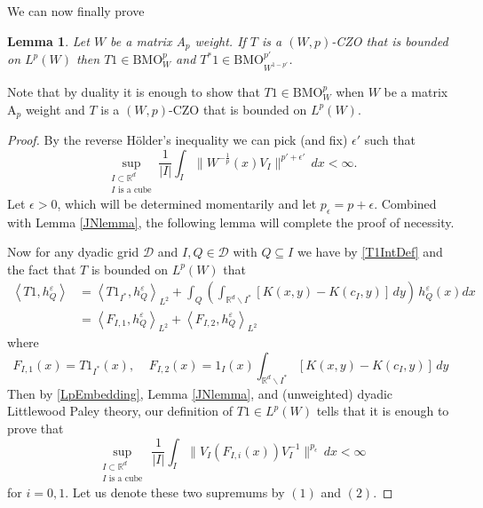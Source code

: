 \documentclass[12pt,reqno ]{amsart}
\numberwithin{equation}{section}
\newtheorem{lemma}[theorem]{Lemma}
\theoremstyle{definition}
\newcommand{\R}{\ensuremath{\mathbb{R}}}
\newcommand{\Rd}{\ensuremath{\mathbb{R}^d}}
\newcommand{\D}{\ensuremath{\mathscr{D}}}
\newcommand{\BMOW}{\ensuremath{{\text{BMO}}_W ^p}}
\newcommand{\BMOWq}{\ensuremath{{\text{BMO}}_{W^{1 - p'}}^{p'} }}
\newcommand{\ip}[2]{\ensuremath{\left\langle#1,#2\right\rangle}}
\begin{document}
We can now finally prove
 \begin{lemma} Let $W$ be a matrix A${}_p$ weight.  If $T$ is a $(W, p)$-CZO that is bounded on $L^p(W)$ then $T1 \in \BMOW$ and $T^* 1 \in \BMOWq$.
 \end{lemma}


Note that by duality it is enough to show that $T1 \in \BMOW$ when $W$ be a matrix A${}_p$ weight and $T$ is a $(W, p)$-CZO that is bounded on $L^p(W)$.


\begin{proof}   By the reverse H\"{o}lder's inequality we can pick (and fix) $\epsilon'$ such that \begin{equation*} \sup_{\substack{I \subset \R^d \\  I \text{ is a cube}}} \frac{1}{|I|} \int_I \|W^{-\frac{1}{p}} (x) V_I\|^{p' + \epsilon'} \, dx < \infty. \end{equation*}  Let $\epsilon > 0$, which will be determined momentarily and let $p_\epsilon = p + \epsilon$.   Combined with Lemma \ref{JNlemma}, the following lemma will complete the proof of necessity.


Now for any dyadic grid $\D$ and $I, Q \in \D$ with $Q \subseteq I$ we have by \eqref{T1IntDef} and the fact that $T$ is bounded on $L^p(W)$ that \begin{align*} \ip{T1}{h_Q ^\varepsilon} & = \ip{T 1_{I^*}}{h_Q ^\varepsilon}_{L^2}  + \int_Q  \left(\int_{\Rd \backslash I^*} [K(x, y) - K(c_I, y)]  \, dy \right)\, h_Q ^\varepsilon (x) dx   \\ & = \ip{F_{I, 1}}{h_Q ^\varepsilon}_{L^2} + \ip{F_{I, 2}}{h_Q ^\varepsilon}_{L^2} \end{align*} where \begin{equation*} F_{I, 1} (x)  = T 1_{I^*} (x), \ \ \ \ \ F_{I, 2} (x) = 1_I (x) \int_{\Rd \backslash I^*} [K(x, y) - K(c_I, y)]  \, dy \end{equation*}  Then by \eqref{LpEmbedding},  Lemma \ref{JNlemma}, and (unweighted) dyadic Littlewood Paley theory, our definition of $T1 \in L^p(W)$ tells that it is enough to prove that  \begin{equation*} \sup_{\substack{I \subset \R^d \\  I \text{ is a cube}}}\,  \frac{1}{|I|} \int_I \| V_I (F_{I, i} (x) )V_I ^{-1} \|^{p_\epsilon} \, dx < \infty \end{equation*} for $i = 0, 1$.  Let us denote these two supremums by $(1)$ and $(2)$.



\end{proof}
\end{document}
